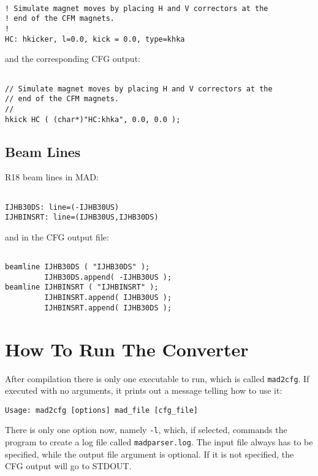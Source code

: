 \documentclass[12pt]{article}
\begin{document}
\begin{verbatim}

! Simulate magnet moves by placing H and V correctors at the
! end of the CFM magnets.
!
HC: hkicker, l=0.0, kick = 0.0, type=khka

\end{verbatim}

\noindent and the corresponding CFG output:

\begin{verbatim}

// Simulate magnet moves by placing H and V correctors at the
// end of the CFM magnets.
//
hkick HC ( (char*)"HC:khka", 0.0, 0.0 );

\end{verbatim}

\subsection{Beam Lines}
R18 beam lines in MAD:

\begin{verbatim}

IJHB30DS: line=(-IJHB30US)
IJHBINSRT: line=(IJHB30US,IJHB30DS)

\end{verbatim}

\noindent and in the CFG output file:

\begin{verbatim}

beamline IJHB30DS ( "IJHB30DS" );
         IJHB30DS.append( -IJHB30US );
beamline IJHBINSRT ( "IJHBINSRT" );
         IJHBINSRT.append( IJHB30US );
         IJHBINSRT.append( IJHB30DS );

\end{verbatim}


\section{How To Run The Converter}
After compilation there is only one executable to run, which is called
\texttt{mad2cfg}. If executed with no arguments, it prints out a message
telling how to use it:

\begin{verbatim}
Usage: mad2cfg [options] mad_file [cfg_file]
\end{verbatim}

There is only one option now, namely \texttt{-l}, which, if selected, commands
the program to create a log file called \texttt{madparser.log}. The input
file always has to be specified, while the output file argument is optional.
If it is not specified, the CFG output will go to STDOUT.
\end{document}

